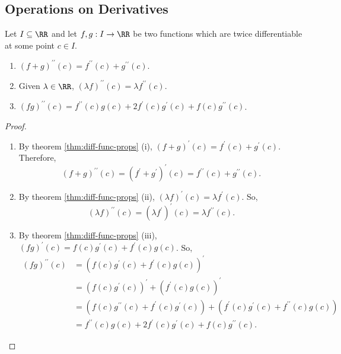 \documentclass[../real_analysis.tex]{subfiles}
\begin{document}
        \subsection{Operations on Derivatives}\label{subsec:operations-on-derivatives}
            \begin{theorem}\label{thm:2nd-diff-func-props}
                Let $I\subseteq\RR$ and let $f,g:I\to\RR$ be two functions which are twice differentiable at some point $c\in I$.
                \begin{enumerate}[label={\upshape(\roman*)}]
                    \item $(f+g)^{\prime\prime}(c)=f^{\prime\prime}(c)+g^{\prime\prime}(c)$.
                    \item Given $\lambda\in\RR$, $(\lambda f)^{\prime\prime}(c)=\lambda f^{\prime\prime}(c)$.
                    \item $(fg)^{\prime\prime}(c)=f^{\prime\prime}(c)g(c)+2f^\prime(c)g^\prime(c)+f(c)g^{\prime\prime}(c)$.
                \end{enumerate}
            \end{theorem}
            \begin{proof}\\
                \begin{enumerate}[label={\upshape(\roman*)}]
                    \item By theorem \ref{thm:diff-func-props} (i), $(f+g)^\prime(c)=f^\prime(c)+g^\prime(c)$. Therefore,
                    \begin{equation}
                        (f+g)^{\prime\prime}(c)=(f^\prime+g^\prime)^\prime(c)=f^{\prime\prime}(c)+g^{\prime\prime}(c).
                    \end{equation}
                    \item By theorem \ref{thm:diff-func-props} (ii), $(\lambda f)^\prime(c)=\lambda f^\prime(c)$. So,
                    \begin{equation}
                        (\lambda f)^{\prime\prime}(c)=(\lambda f^\prime)^\prime(c)=\lambda f^{\prime\prime}(c).
                    \end{equation}
                    \item By theorem \ref{thm:diff-func-props} (iii), $(fg)^\prime(c)=f(c)g^\prime(c)+f^\prime(c)g(c)$. So,
                    \begin{align}
                        (fg)^{\prime\prime}(c)&=(f(c)g^\prime(c)+f^\prime(c)g(c))^\prime\\
                        &=(f(c)g^\prime(c))^\prime+(f^\prime(c)g(c))^\prime\\
                        &=(f(c)g^{\prime\prime}(c)+f^\prime(c)g^\prime(c))+(f^\prime(c)g^\prime(c)+f^{\prime\prime}(c)g(c))\\
                        &=f^{\prime\prime}(c)g(c)+2f^\prime(c)g^\prime(c)+f(c)g^{\prime\prime}(c).
                    \end{align}
                \end{enumerate}
            \end{proof}
\end{document}
